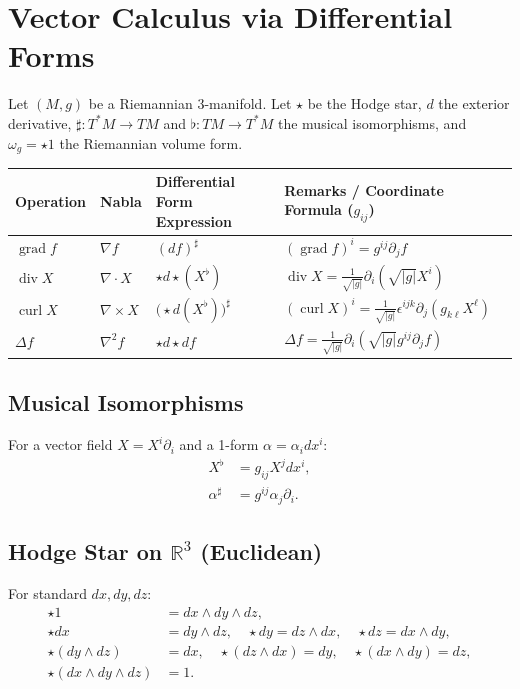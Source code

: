 \documentclass[12pt]{article}
\begin{document}
\newpage
\section*{Vector Calculus via Differential Forms}
Let $(M,g)$ be a Riemannian $3$-manifold. Let $\star$ be the Hodge star, $d$ the exterior derivative, $\sharp: T^*M \to TM$ and $\flat: TM \to T^*M$ the musical isomorphisms, and $\omega_g = \star 1$ the Riemannian volume form.

\begin{tabularx}{\textwidth}{>{\raggedright\arraybackslash}p{} >{\raggedright\arraybackslash}p{}  >{\raggedright\arraybackslash}p{} >{\raggedright\arraybackslash}X}
	\hline
	\textbf{Operation} & \textbf{Nabla} & \textbf{Differential Form Expression} & \textbf{Remarks / Coordinate Formula ($g_{ij}$)} \\
	\hline
	$\operatorname{grad} f$ & $\nabla f$  & $(df)^\sharp$ & $(\operatorname{grad} f)^i = g^{ij}\partial_j f$ \\
	$\operatorname{div} X$  & $\nabla \cdot X$ &  $\star d \star (X^\flat)$ & $\operatorname{div} X = \frac{1}{\sqrt{|g|}}\partial_i(\sqrt{|g|} X^i)$ \\
	$\operatorname{curl} X$ & $\nabla \times X$ & $\bigl(\star d (X^\flat)\bigr)^\sharp$ & $(\operatorname{curl} X)^i = \frac{1}{\sqrt{|g|}} \epsilon^{ijk}\partial_j(g_{k\ell}X^\ell)$ \\
	$\Delta f$ & $\nabla^2f $ & $\star d \star d f$ & $\Delta f = \frac{1}{\sqrt{|g|}}\partial_i(\sqrt{|g|}g^{ij}\partial_j f)$ \\
	\hline
\end{tabularx}

\subsection*{Musical Isomorphisms}
For a vector field $X = X^i\partial_i$ and a 1-form $\alpha = \alpha_i dx^i$:
\begin{align*}
	X^\flat &= g_{ij} X^j dx^i, \\
	\alpha^\sharp &= g^{ij} \alpha_j \partial_i.
\end{align*}

\subsection*{Hodge Star on $\mathbb{R}^3$ (Euclidean)}
For standard $dx, dy, dz$:
\begin{align*}
	\star 1 &= dx\wedge dy\wedge dz, \\
	\star dx &= dy\wedge dz, \quad \star dy = dz\wedge dx, \quad \star dz = dx\wedge dy, \\
	\star (dy\wedge dz) &= dx, \quad \star (dz\wedge dx) = dy, \quad \star (dx\wedge dy) = dz, \\
	\star (dx\wedge dy\wedge dz) &= 1.
\end{align*}
\end{document}
